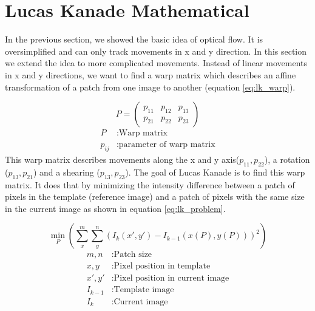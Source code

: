 \documentclass[11pt,a4paper,titlepage,oneside]{report}
\begin{document}
\section{Lucas Kanade Mathematical}

In the previous section, we showed the basic idea of optical flow. It is oversimplified and can only track movements in x and y direction. In this section we extend the idea to more complicated movements. Instead of linear movements in x and y directions, we want to find a warp matrix which describes an affine transformation of a patch from one image to another (equation \ref{eq:lk_warp}).

\begin{equation}\label{eq:lk_warp}
  P=\begin{pmatrix}
    p_{11} & p_{12} & p_{13} \\
    p_{21} & p_{22} & p_{23}
  \end{pmatrix}
\end{equation}
\begin{align*}
  P       &:  \text{Warp matrix}\\
  p_{ij}  &:  \text{parameter of warp matrix}
\end{align*}
This warp matrix describes movements along the x and y axis($p_{11},p_{22}$), a rotation ($p_{13},p_{21}$) and a shearing ($p_{13},p_{23}$). The goal of Lucas Kanade is to find this warp matrix. It does that by minimizing the intensity difference between a patch of pixels in the template (reference image) and a patch of pixels with the same size in the current image as shown in equation \ref{eq:lk_problem}. 

\begin{equation}\label{eq:lk_problem}
  \min_P(\sum_x^m\sum_y^n(I_{k}(x',y')-I_{k-1}(x(P),y(P)))^2)
\end{equation}
\begin{align*}
  m,n       &: \text{Patch size}\\
  x,y       &: \text{Pixel position in template}\\
  x',y'     &: \text{Pixel position in current image}\\
  I_{k-1}   &: \text{Template image}\\
  I_{k}     &: \text{Current image}\\
\end{align*}
\end{document}

